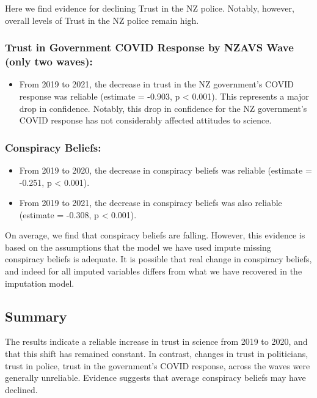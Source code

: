 \documentclass[
  singlecolumn]{report}
\providecommand{\tightlist}{%
  \setlength{\itemsep}{0pt}\setlength{\parskip}{0pt}}\usepackage{longtable,booktabs,array}
\begin{document}
Here we find evidence for declining Trust in the NZ police. Notably,
however, overall levels of Trust in the NZ police remain high.

\hypertarget{trust-in-government-covid-response-by-nzavs-wave-only-two-waves}{%
\subsubsection{Trust in Government COVID Response by NZAVS Wave (only
two
waves):}\label{trust-in-government-covid-response-by-nzavs-wave-only-two-waves}}

\begin{itemize}
\tightlist
\item
  From 2019 to 2021, the decrease in trust in the NZ government's COVID
  response was reliable (estimate = -0.903, p \textless{} 0.001). This
  represents a major drop in confidence. Notably, this drop in
  confidence for the NZ government's COVID response has not considerably
  affected attitudes to science.
\end{itemize}

\hypertarget{conspiracy-beliefs}{%
\subsubsection{Conspiracy Beliefs:}\label{conspiracy-beliefs}}

\begin{itemize}
\tightlist
\item
  From 2019 to 2020, the decrease in conspiracy beliefs was reliable
  (estimate = -0.251, p \textless{} 0.001).
\item
  From 2019 to 2021, the decrease in conspiracy beliefs was also
  reliable (estimate = -0.308, p \textless{} 0.001).
\end{itemize}

On average, we find that conspiracy beliefs are falling. However, this
evidence is based on the assumptions that the model we have used impute
missing conspiracy beliefs is adequate. It is possible that real change
in conspiracy beliefs, and indeed for all imputed variables differs from
what we have recovered in the imputation model.

\hypertarget{summary}{%
\subsection{Summary}\label{summary}}

The results indicate a reliable increase in trust in science from 2019
to 2020, and that this shift has remained constant. In contrast, changes
in trust in politicians, trust in police, trust in the government's
COVID response, across the waves were generally unreliable. Evidence
suggests that average conspiracy beliefs may have declined.
\end{document}
